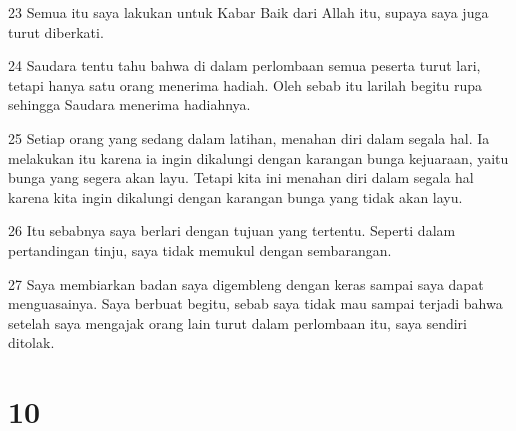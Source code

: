 \par 23 Semua itu saya lakukan untuk Kabar Baik dari Allah itu, supaya saya juga turut diberkati.
\par 24 Saudara tentu tahu bahwa di dalam perlombaan semua peserta turut lari, tetapi hanya satu orang menerima hadiah. Oleh sebab itu larilah begitu rupa sehingga Saudara menerima hadiahnya.
\par 25 Setiap orang yang sedang dalam latihan, menahan diri dalam segala hal. Ia melakukan itu karena ia ingin dikalungi dengan karangan bunga kejuaraan, yaitu bunga yang segera akan layu. Tetapi kita ini menahan diri dalam segala hal karena kita ingin dikalungi dengan karangan bunga yang tidak akan layu.
\par 26 Itu sebabnya saya berlari dengan tujuan yang tertentu. Seperti dalam pertandingan tinju, saya tidak memukul dengan sembarangan.
\par 27 Saya membiarkan badan saya digembleng dengan keras sampai saya dapat menguasainya. Saya berbuat begitu, sebab saya tidak mau sampai terjadi bahwa setelah saya mengajak orang lain turut dalam perlombaan itu, saya sendiri ditolak.

\chapter{10}

